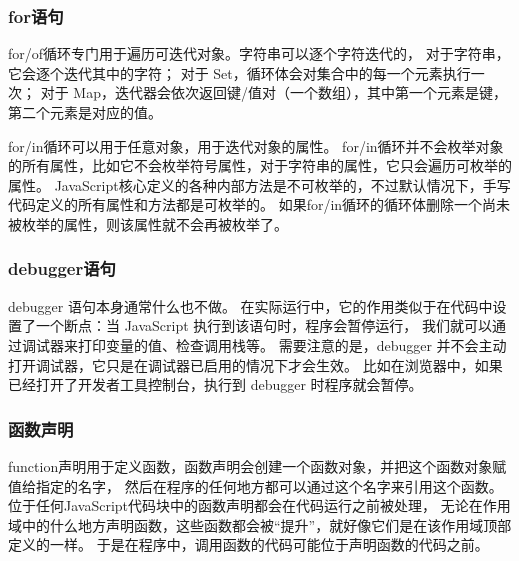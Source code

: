 \subsubsection{for语句}
for/of循环专门用于遍历可迭代对象。字符串可以逐个字符迭代的，
对于字符串，它会逐个迭代其中的字符；
对于 Set，循环体会对集合中的每一个元素执行一次；
对于 Map，迭代器会依次返回键/值对（一个数组），其中第一个元素是键，第二个元素是对应的值。

for/in循环可以用于任意对象，用于迭代对象的属性。
for/in循环并不会枚举对象的所有属性，比如它不会枚举符号属性，对于字符串的属性，它只会遍历可枚举的属性。
JavaScript核心定义的各种内部方法是不可枚举的，不过默认情况下，手写代码定义的所有属性和方法都是可枚举的。
如果for/in循环的循环体删除一个尚未被枚举的属性，则该属性就不会再被枚举了。

\subsubsection{debugger语句}
debugger 语句本身通常什么也不做。
在实际运行中，它的作用类似于在代码中设置了一个断点：当 JavaScript 执行到该语句时，程序会暂停运行，
我们就可以通过调试器来打印变量的值、检查调用栈等。
需要注意的是，debugger 并不会主动打开调试器，它只是在调试器已启用的情况下才会生效。
比如在浏览器中，如果已经打开了开发者工具控制台，执行到 debugger 时程序就会暂停。

\subsubsection{函数声明}
function声明用于定义函数，函数声明会创建一个函数对象，并把这个函数对象赋值给指定的名字，
然后在程序的任何地方都可以通过这个名字来引用这个函数。位于任何JavaScript代码块中的函数声明都会在代码运行之前被处理，
无论在作用域中的什么地方声明函数，这些函数都会被“提升”，就好像它们是在该作用域顶部定义的一样。
于是在程序中，调用函数的代码可能位于声明函数的代码之前。

